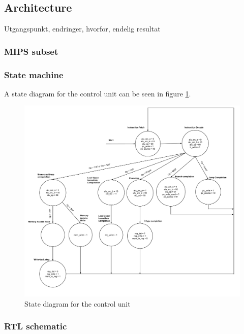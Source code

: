 \subsection{Architecture}

Utgangspunkt, endringer, hvorfor, endelig resultat

\subsubsection{MIPS subset}

\subsubsection{State machine}

A state diagram for the control unit can be seen in figure \ref{fig:state_machine}.

\begin{figure}[ht!]
    \begin{center}
    \includegraphics[width=\textwidth]{assets/state_machine.pdf}
    \caption{State diagram for the control unit}
    \label{fig:state_machine}
    \end{center}
\end{figure}

\subsubsection{RTL schematic}

